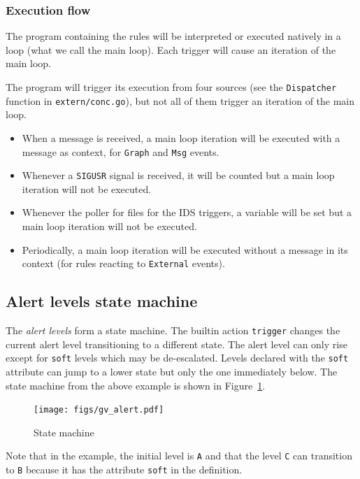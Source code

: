 \documentclass[a4paper]{article}
\begin{document}
\subsubsection{Execution flow}
The program containing the rules will be interpreted or executed natively in a loop
(what we call the main loop). Each trigger will cause an iteration of the main loop.

The program will trigger its execution from four sources
(see the \verb+Dispatcher+ function in \texttt{extern/conc.go}), but not
all of them trigger an iteration of the main loop.
\begin{itemize}
\item When a
message is received, a main loop iteration will be executed with a message as context, for
\texttt{Graph} and \texttt{Msg} events.

\item  Whenever a \texttt{SIGUSR}
signal is received, it will be counted but a main loop iteration will not
be executed.
\item  Whenever the poller for files for
the IDS triggers, a variable will be set but a main loop iteration will not
be executed.
\item Periodically, a main loop iteration will be executed without a
message in its context (for rules reacting to \texttt{External} events).
\end{itemize}


\subsection{Alert levels state machine}
The \emph{alert levels} form a state machine. The builtin action \texttt{trigger}
changes the current alert level transitioning to a different state. The alert level
can only rise except for
\texttt{soft} levels which may be de-escalated. Levels declared with the \texttt{soft} attribute
can jump to a lower state but only the one immediately below.
The state machine from the above example is shown in Figure~\ref{fig:state}.

\begin{figure}[t!]
\begin{center}
	\texttt{[image: figs/gv\_alert.pdf]}
\caption{State machine \label{fig:state}}
\end{center}
\end{figure}

Note that in the example, the initial level is \texttt{A} and that the level \texttt{C} can
transition to \texttt{B} because it has the attribute \texttt{soft} in the definition.
\end{document}
